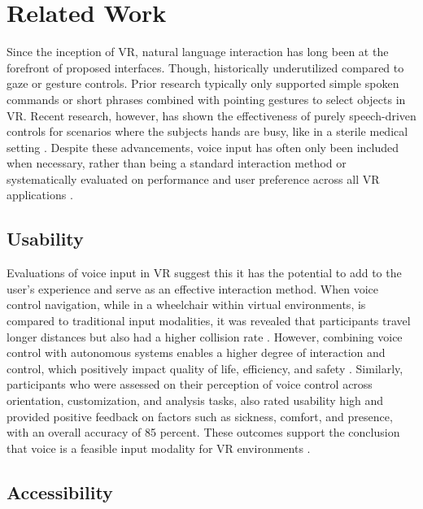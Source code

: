 \documentclass[manuscript, screen, review]{acmart}
\begin{document}
\section{Related Work}
Since the inception of VR, natural language interaction has long been at the forefront of proposed interfaces. Though, historically underutilized compared to gaze or gesture controls\cite{a1}. Prior research typically only supported simple spoken commands or short phrases combined with pointing gestures to select objects in VR. Recent research, however, has shown the effectiveness of purely speech-driven controls for scenarios where the subjects hands are busy, like in a sterile medical setting \cite{a2}. Despite these advancements,  voice input has often only been included when necessary, rather than being a standard interaction method or systematically evaluated on performance and user preference across all VR applications \cite{a1}.

\subsection{Usability}
Evaluations of voice input in VR suggest this it has the potential to add to the user's experience  \cite{a3} and serve as an effective interaction method. When voice control navigation, while in a wheelchair within virtual environments, is compared to traditional input modalities, it was revealed that participants travel longer distances but also had a higher collision rate \cite{a3}. However, combining voice control with autonomous systems enables a higher degree of interaction and control, which positively impact quality of life, efficiency, and safety \cite{a3}. Similarly, participants who were assessed on their perception of voice control across orientation, customization, and analysis tasks, also rated usability high and provided positive feedback on factors such as sickness, comfort, and presence, with an overall accuracy of 85 percent. These outcomes support the conclusion that voice is a feasible input modality for VR environments \cite{a2}.

\subsection{Accessibility}
\end{document}
